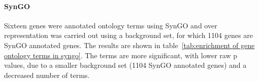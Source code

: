

 
 
\paragraph{SynGO}

Sixteen genes were annotated ontology terms using SynGO and over representation was carried out using a background set, for which 1104 genes are SynGO annotated genes. The results are shown in table~\ref{tab:enrichment of gene ontology terms in syngo}. The terms are more significant, with lower raw p values, due to a smaller background set (1104 SynGO annotated genes) and a decreased number of terms. 

